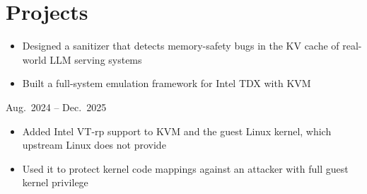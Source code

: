 \section{Projects}

\begin{itemize}
  \begin{itemize}
    \item Designed a sanitizer that detects memory-safety bugs in the KV cache
      of real-world LLM serving systems
  \end{itemize}

  \begin{itemize}
    \item Built a full-system emulation framework for Intel TDX with KVM
  \end{itemize}

        {Aug.~2024 -- Dec.~2025}{}{}
  \begin{itemize}
    \item Added Intel VT-rp support to KVM and the guest Linux kernel, which
      upstream Linux does not provide
    \item Used it to protect kernel code mappings against an attacker with full
      guest kernel privilege
  \end{itemize}
\end{itemize}
